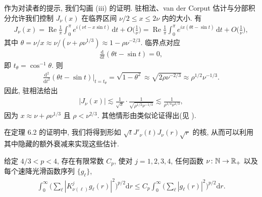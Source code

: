 作为对读者的提示, 我们勾画 (iii) 的证明. 驻相法、van der Corput 估计与分部积分允许我们控制 $J_{\nu}(x)$ 在临界区间 $\nu/2 \leq x \leq 2\nu$ 内的大小. 有
\begin{align*}
  J_{\nu}(x)=\operatorname{Re}\frac{1}{\pi}\int_{0}^{\pi}e^{i(\nu t-x\sin t)}\,\mathrm{d}t+O\Big(\frac{1}{\nu}\Big)
  =\operatorname{Re}\frac{1}{\pi}\int_{0}^{\pi}e^{ix(\theta t-\sin t)}\,\mathrm{d}t+O\Big(\frac{1}{\nu}\Big),
\end{align*}
其中 $\theta = \nu/x \approx \nu/(\nu + \rho\nu^{1/3}) \approx 1 - \rho\nu^{-2/3}$. 临界点对应
\begin{align*}
  \frac{\mathrm{d}}{\mathrm{d}t}(\theta t-\sin t)=0,
\end{align*}
即 $t_{\theta} = \cos^{-1}\theta$. 则
\begin{align*}
  \frac{\mathrm{d}^{2}}{\mathrm{d}t^{2}}(\theta t-\sin t)\Big|_{t=t_{\theta}}
  =\sqrt{1-\theta^{2}}\approx\sqrt{2\rho\nu^{-2/3}}\approx\rho^{1/2}\nu^{-1/3}.
\end{align*}
因此, 驻相法给出
\begin{align*}
  |J_{\nu}(x)|\lesssim\frac{1}{\sqrt{x}}\cdot\frac{1}{\sqrt{\rho^{1/2}\nu^{-1/3}}}
  \lesssim\frac{1}{\rho^{1/4}\nu^{1/3}},
\end{align*}
因为 $x \approx \nu + \rho\nu^{1/3}$ 且 $\rho < \nu^{2/3}$. 其他情形由类似论证得出(见 \cite{b130,b131,b147}).

在定理 6.2 的证明中, 我们将得到形如 $\sqrt{t}J'_{\nu}(t)J_{\nu}(r)\sqrt{r}$ 的核, 从而可以利用其中隐藏的额外衰减来实现这些估计.

\begin{proposition}\label{prop:6.4}
给定 $4/3 < p < 4$, 存在有限常数 $C_p$, 使对 $j = 1,2,3,4$, 任何函数 $\nu\colon \mathbb{N} \to \mathbb{R}_+$ 以及每个速降光滑函数序列 $\{g_\ell\}$,
\begin{align*}
  \int_{0}^{\infty}\Big(\sum_{\ell}|K_{\nu(\ell)}^{j}g_{\ell}(r)|^{2}\Big)^{p/2}\mathrm{d}r
  \leq C_{p}\int_{0}^{\infty}\Big(\sum_{\ell}|g_{\ell}(r)|^{2}\Big)^{p/2}\mathrm{d}r.
\end{align*}
\end{proposition}

